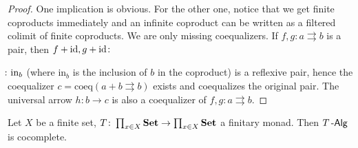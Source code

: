 \documentclass[a4paper,11pt,oneside,openany]{scrbook}
\begin{document}
\begin{proof}
	One implication is obvious. For the other one, notice that we get finite
    coproducts immediately and an infinite coproduct can be written as a
    filtered colimit of finite coproducts. We are only missing coequalizers. If
    $f,g\colon a\rightrightarrows b$ is a pair, then
    $f+\operatorname{id},g+\operatorname{id}\colon\hspace{-1.5mm}$$\hspace{-1.5mm}\colon\text{in}_b$ (where in$_b$ is the
	inclusion of $b$ in the coproduct) is a reflexive pair, hence the
	coequalizer $c=\text{coeq}(a+b\rightrightarrows b)$ exists and coequalizes
	the original pair. The universal arrow $h\colon b\rightarrow c$ is also a
	coequalizer of $f,g\colon a\rightrightarrows b$.
\end{proof}
\begin{thm}
	Let $X$ be a finite set, $T\colon\prod_{x\in X}{\normalfont\textbf{Set}}\to\prod_{x\in X}{\normalfont\textbf{Set}}$ a finitary monad. Then $T\operatorname{-\mathsf{Alg}}$ is cocomplete.
\end{thm}
\end{document}

